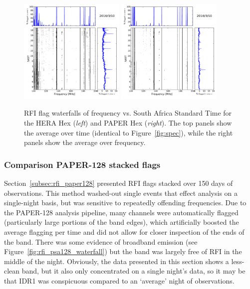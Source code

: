 \begin{figure}
\centering
\includegraphics[width=0.45\textwidth]{chapters/data_processing/figures/RFI_HH_wf_tzoom.pdf}
\includegraphics[width=0.45\textwidth]{chapters/data_processing/figures/RFI_PH_wf_tzoom.pdf}
\caption[RFI flag waterfalls of frequency vs. South Africa Standard Time for the HERA Hex and PAPER Hex.]{RFI flag waterfalls of frequency vs. South Africa Standard Time for the HERA Hex (\textit{left}) and PAPER Hex (\textit{right}). The top panels show the average over time (identical to Figure~\ref{fig:spec}), while the right panels show the average over frequency.}
\label{fig:rfi_hex_waterfalls}
\end{figure}

\subsubsection{Comparison PAPER-128 stacked flags}
Section~\ref{subsec:rfi_paper128} presented RFI flags stacked over 150 days of observations. This method washed-out single events that effect analysis on a single-night basis, but was sensitive to repeatedly offending frequencies. Due to the PAPER-128 analysis pipeline, many channels were automatically flagged (particularly large portions of the band edges), which artificially boosted the average flagging per time and did not allow for closer inspection of the ends of the band. There was some evidence of broadband emission (see Figure~\ref{fig:rfi_psa128_waterfall}) but the band was largely free of RFI in the middle of the night. Obviously, the data presented in this section shows a less-clean band, but it also only concentrated on a single night's data, so it may be that IDR1 was conspicuous compared to an `average' night of observations.

